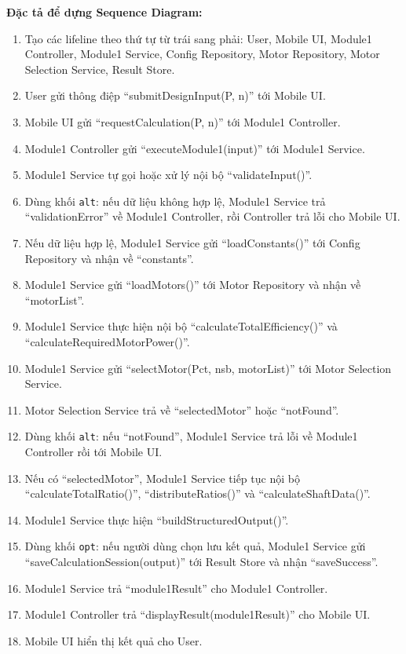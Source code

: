\documentclass[a4paper]{article}
\begin{document}
\textbf{Đặc tả để dựng Sequence Diagram:}
\begin{enumerate}
\item Tạo các lifeline theo thứ tự từ trái sang phải: User, Mobile UI, Module1 Controller, Module1 Service, Config Repository, Motor Repository, Motor Selection Service, Result Store.
\item User gửi thông điệp ``submitDesignInput(P, n)'' tới Mobile UI.
\item Mobile UI gửi ``requestCalculation(P, n)'' tới Module1 Controller.
\item Module1 Controller gửi ``executeModule1(input)'' tới Module1 Service.
\item Module1 Service tự gọi hoặc xử lý nội bộ ``validateInput()''.
\item Dùng khối \texttt{alt}: nếu dữ liệu không hợp lệ, Module1 Service trả ``validationError'' về Module1 Controller, rồi Controller trả lỗi cho Mobile UI.
\item Nếu dữ liệu hợp lệ, Module1 Service gửi ``loadConstants()'' tới Config Repository và nhận về ``constants''.
\item Module1 Service gửi ``loadMotors()'' tới Motor Repository và nhận về ``motorList''.
\item Module1 Service thực hiện nội bộ ``calculateTotalEfficiency()'' và ``calculateRequiredMotorPower()''.
\item Module1 Service gửi ``selectMotor(Pct, nsb, motorList)'' tới Motor Selection Service.
\item Motor Selection Service trả về ``selectedMotor'' hoặc ``notFound''.
\item Dùng khối \texttt{alt}: nếu ``notFound'', Module1 Service trả lỗi về Module1 Controller rồi tới Mobile UI.
\item Nếu có ``selectedMotor'', Module1 Service tiếp tục nội bộ ``calculateTotalRatio()'', ``distributeRatios()'' và ``calculateShaftData()''.
\item Module1 Service thực hiện ``buildStructuredOutput()''.
\item Dùng khối \texttt{opt}: nếu người dùng chọn lưu kết quả, Module1 Service gửi ``saveCalculationSession(output)'' tới Result Store và nhận ``saveSuccess''.
\item Module1 Service trả ``module1Result'' cho Module1 Controller.
\item Module1 Controller trả ``displayResult(module1Result)'' cho Mobile UI.
\item Mobile UI hiển thị kết quả cho User.
\end{enumerate}
\end{document}
